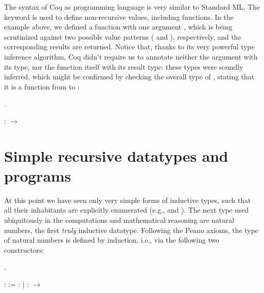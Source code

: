 The syntax of Coq as programming language is very similar to Standard
ML. The keyword   is used to define
non-recursive values, including functions. In the example above, we
defined a function with one argument , which is being scrutinized
against two possible value patterns ( and ),
respectively, and the corresponding results are returned. Notice that,
thanks to its very powerful type inference algorithm, Coq didn't
require us to annotate neither the argument  with its type, nor the
function itself with its result type: these types were soundly
inferred, which might be confirmed by checking the overall type of
, stating that it is a function from  to :


\begin{coqdoccode}
\coqdocemptyline
\coqdocnoindent
{} .\coqdoceol
\end{coqdoccode}
 :  \ensuremath{\rightarrow} 



\section{Simple recursive datatypes and programs}




At this point we have seen only very simple forms of inductive types,
such that all their inhabitants are explicitly enumerated (e.g.,
 and ). The next type used ubiquitously in the
computations and mathematical reasoning are natural numbers, the first
\textit{truly} inductive datatype. Following the Peano axioms, the type 
of natural numbers is defined by induction, i.e., via the following
two constructors: 


\begin{coqdoccode}
\coqdocemptyline
\coqdocnoindent
{} .\coqdoceol
\coqdocemptyline
\end{coqdoccode}
  :  :=   :  \ensuremath{|}  :  \ensuremath{\rightarrow} 




